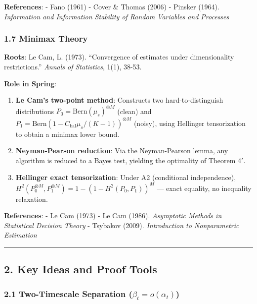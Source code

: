 \documentclass[
  12pt,
]{article}
\begin{document}
\textbf{References}: - Fano (1961) - Cover \& Thomas (2006) - Pinsker (1964). \emph{Information and Information Stability of Random Variables and Processes}

\subsubsection{1.7 Minimax Theory}\label{minimax-theory}

\textbf{Roots}: Le Cam, L. (1973). ``Convergence of estimates under dimensionality restrictions.'' \emph{Annals of Statistics}, 1(1), 38-53.

\textbf{Role in Spring}:

\begin{enumerate}
\def\labelenumi{\arabic{enumi}.}
\item
  \textbf{Le Cam's two-point method}: Constructs two hard-to-distinguish distributions $P_0 = \text{Bern}(\mu_s)^{\otimes M}$ (clean) and $P_1 = \text{Bern}(1 - C_{\text{bal}}\mu_s/(K-1))^{\otimes M}$ (noisy), using Hellinger tensorization to obtain a minimax lower bound.
\item
  \textbf{Neyman-Pearson reduction}: Via the Neyman-Pearson lemma, any algorithm is reduced to a Bayes test, yielding the optimality of Theorem 4$'$.
\item
  \textbf{Hellinger exact tensorization}: Under A2 (conditional independence), $H^2(P_0^{\otimes M}, P_1^{\otimes M}) = 1 - (1 - H^2(P_0, P_1))^M$ --- exact equality, no inequality relaxation.
\end{enumerate}

\textbf{References}: - Le Cam (1973) - Le Cam (1986). \emph{Asymptotic Methods in Statistical Decision Theory} - Tsybakov (2009). \emph{Introduction to Nonparametric Estimation}

\begin{center}\rule{0.5\linewidth}{0.5pt}\end{center}

\subsection{2. Key Ideas and Proof Tools}\label{key-ideas-and-proof-tools}

\subsubsection{2.1 Two-Timescale Separation ($\beta_t = o(\alpha_t)$)}\label{two-timescale-separation}
\end{document}
